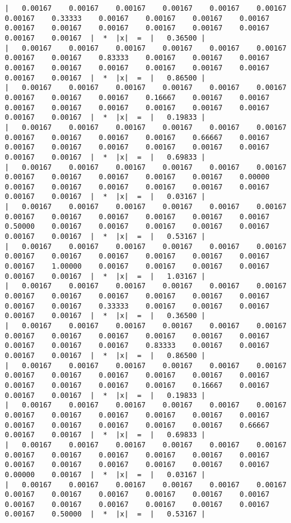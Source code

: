 \documentclass[a4paper,12pt,titlepage,finall]{article}
\begin{document}
\begin{verbatim}
|   0.00167    0.00167    0.00167    0.00167    0.00167    0.00167    0.00167    0.33333    0.00167    0.00167    0.00167    0.00167    0.00167    0.00167    0.00167    0.00167    0.00167    0.00167    0.00167    0.00167  |  *  |x|  =  |   0.36500 |
|   0.00167    0.00167    0.00167    0.00167    0.00167    0.00167    0.00167    0.00167    0.83333    0.00167    0.00167    0.00167    0.00167    0.00167    0.00167    0.00167    0.00167    0.00167    0.00167    0.00167  |  *  |x|  =  |   0.86500 |
|   0.00167    0.00167    0.00167    0.00167    0.00167    0.00167    0.00167    0.00167    0.00167    0.16667    0.00167    0.00167    0.00167    0.00167    0.00167    0.00167    0.00167    0.00167    0.00167    0.00167  |  *  |x|  =  |   0.19833 |
|   0.00167    0.00167    0.00167    0.00167    0.00167    0.00167    0.00167    0.00167    0.00167    0.00167    0.66667    0.00167    0.00167    0.00167    0.00167    0.00167    0.00167    0.00167    0.00167    0.00167  |  *  |x|  =  |   0.69833 |
|   0.00167    0.00167    0.00167    0.00167    0.00167    0.00167    0.00167    0.00167    0.00167    0.00167    0.00167    0.00000    0.00167    0.00167    0.00167    0.00167    0.00167    0.00167    0.00167    0.00167  |  *  |x|  =  |   0.03167 |
|   0.00167    0.00167    0.00167    0.00167    0.00167    0.00167    0.00167    0.00167    0.00167    0.00167    0.00167    0.00167    0.50000    0.00167    0.00167    0.00167    0.00167    0.00167    0.00167    0.00167  |  *  |x|  =  |   0.53167 |
|   0.00167    0.00167    0.00167    0.00167    0.00167    0.00167    0.00167    0.00167    0.00167    0.00167    0.00167    0.00167    0.00167    1.00000    0.00167    0.00167    0.00167    0.00167    0.00167    0.00167  |  *  |x|  =  |   1.03167 |
|   0.00167    0.00167    0.00167    0.00167    0.00167    0.00167    0.00167    0.00167    0.00167    0.00167    0.00167    0.00167    0.00167    0.00167    0.33333    0.00167    0.00167    0.00167    0.00167    0.00167  |  *  |x|  =  |   0.36500 |
|   0.00167    0.00167    0.00167    0.00167    0.00167    0.00167    0.00167    0.00167    0.00167    0.00167    0.00167    0.00167    0.00167    0.00167    0.00167    0.83333    0.00167    0.00167    0.00167    0.00167  |  *  |x|  =  |   0.86500 |
|   0.00167    0.00167    0.00167    0.00167    0.00167    0.00167    0.00167    0.00167    0.00167    0.00167    0.00167    0.00167    0.00167    0.00167    0.00167    0.00167    0.16667    0.00167    0.00167    0.00167  |  *  |x|  =  |   0.19833 |
|   0.00167    0.00167    0.00167    0.00167    0.00167    0.00167    0.00167    0.00167    0.00167    0.00167    0.00167    0.00167    0.00167    0.00167    0.00167    0.00167    0.00167    0.66667    0.00167    0.00167  |  *  |x|  =  |   0.69833 |
|   0.00167    0.00167    0.00167    0.00167    0.00167    0.00167    0.00167    0.00167    0.00167    0.00167    0.00167    0.00167    0.00167    0.00167    0.00167    0.00167    0.00167    0.00167    0.00000    0.00167  |  *  |x|  =  |   0.03167 |
|   0.00167    0.00167    0.00167    0.00167    0.00167    0.00167    0.00167    0.00167    0.00167    0.00167    0.00167    0.00167    0.00167    0.00167    0.00167    0.00167    0.00167    0.00167    0.00167    0.50000  |  *  |x|  =  |   0.53167 |


\end{verbatim}
\end{document}
